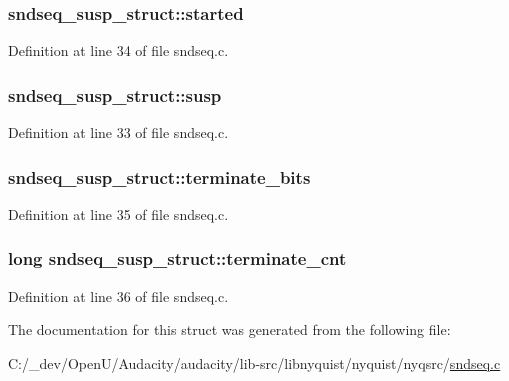 \subsubsection[{\texorpdfstring{started}{started}}]{ sndseq\+\_\+susp\+\_\+struct\+::started}\hypertarget{structsndseq__susp__struct_abe212e71f0fffcfd34b50894fba3ba33}{}\label{structsndseq__susp__struct_abe212e71f0fffcfd34b50894fba3ba33}


Definition at line 34 of file sndseq.\+c.

\subsubsection[{\texorpdfstring{susp}{susp}}]{ sndseq\+\_\+susp\+\_\+struct\+::susp}\hypertarget{structsndseq__susp__struct_a3ba88e4bfa6575588f3038e158d17cc3}{}\label{structsndseq__susp__struct_a3ba88e4bfa6575588f3038e158d17cc3}


Definition at line 33 of file sndseq.\+c.

\subsubsection[{\texorpdfstring{terminate\+\_\+bits}{terminate_bits}}]{ sndseq\+\_\+susp\+\_\+struct\+::terminate\+\_\+bits}\hypertarget{structsndseq__susp__struct_ad5a2331c3f5dd7cc5bc791f2a6d5b494}{}\label{structsndseq__susp__struct_ad5a2331c3f5dd7cc5bc791f2a6d5b494}


Definition at line 35 of file sndseq.\+c.

\subsubsection[{\texorpdfstring{terminate\+\_\+cnt}{terminate_cnt}}]{\setlength{\rightskip}{0pt plus 5cm}long sndseq\+\_\+susp\+\_\+struct\+::terminate\+\_\+cnt}\hypertarget{structsndseq__susp__struct_ae69868d363f2288398b0dcc25e249ce3}{}\label{structsndseq__susp__struct_ae69868d363f2288398b0dcc25e249ce3}


Definition at line 36 of file sndseq.\+c.



The documentation for this struct was generated from the following file\+:\begin{DoxyCompactItemize}
\item 
C\+:/\+\_\+dev/\+Open\+U/\+Audacity/audacity/lib-\/src/libnyquist/nyquist/nyqsrc/\hyperlink{sndseq_8c}{sndseq.\+c}\end{DoxyCompactItemize}
